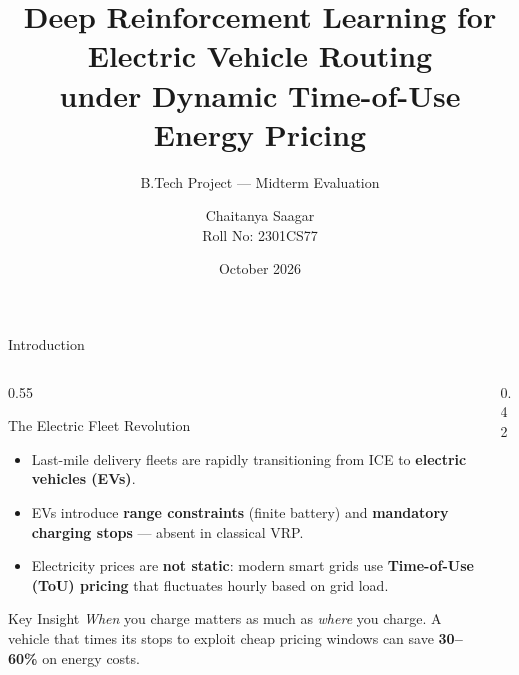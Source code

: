 \documentclass[aspectratio=169, 11pt]{beamer}
\title[EVRP with Dynamic Pricing]{Deep Reinforcement Learning for Electric Vehicle Routing \\ under Dynamic Time-of-Use Energy Pricing}
\subtitle{B.Tech Project --- Midterm Evaluation}
\author[Chaitanya Saagar]{Chaitanya Saagar \\ \small Roll No: 2301CS77}
\institute[]{Supervisor: Prof.\ Samrat Mondal \\ Department of Computer Science \& Engineering}
\date{October 2026}
\begin{document}
{
\begin{frame}
\titlepage
\end{frame}
}

\begin{frame}{Introduction}

\begin{columns}[T]
\begin{column}{0.55\textwidth}

\begin{block}{The Electric Fleet Revolution}
\begin{itemize}
    \item Last-mile delivery fleets are rapidly transitioning from ICE to \textbf{electric vehicles (EVs)}.
    \item EVs introduce \textbf{range constraints} (finite battery) and \textbf{mandatory charging stops} --- absent in classical VRP.
    \item Electricity prices are \textbf{not static}: modern smart grids use \textbf{Time-of-Use (ToU) pricing} that fluctuates hourly based on grid load.
\end{itemize}
\end{block}

\vspace{0.3em}
\begin{alertblock}{Key Insight}
\textit{When} you charge matters as much as \textit{where} you charge.  A vehicle that times its stops to exploit cheap pricing windows can save \textbf{30--60\%} on energy costs.
\end{alertblock}

\end{column}
\begin{column}{0.42\textwidth}

\centering
{}
\end{column}
\end{columns}
\end{frame}
\end{document}
